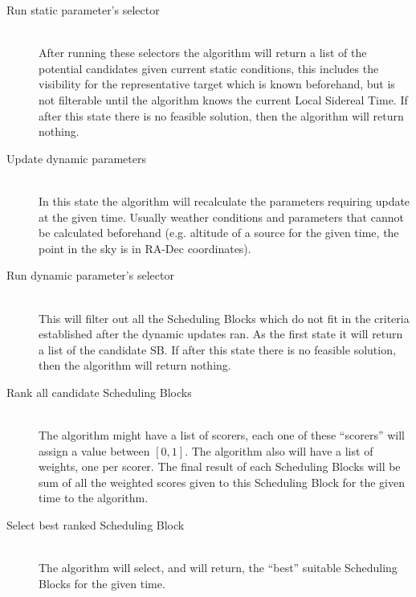 \begin{description}
\item[Run static parameter's selector] \hfill \\
After running these selectors the algorithm will return a list of the potential candidates given current static conditions, this includes the visibility for the representative target which is known beforehand, but is not filterable until the algorithm knows the current Local Sidereal Time. If after this state there is no feasible solution, then the algorithm will return nothing.

\item[Update dynamic parameters] \hfill \\
In this state the algorithm will recalculate the parameters requiring update at the given time. Usually weather conditions and parameters that cannot be calculated beforehand (e.g. altitude of a source for the given time, the point in the sky is in RA-Dec coordinates).  

\item[Run dynamic parameter's selector] \hfill \\
This will filter out all the Scheduling Blocks which do not fit in the criteria established after the dynamic updates ran. As the first state it will return a list of the candidate SB. If after this state there is no feasible solution, then the algorithm will return nothing.

\item[Rank all candidate Scheduling Blocks] \hfill \\
The algorithm might have a list of scorers, each one of these ``scorers'' will assign a value between ${[ 0 , 1 ]}$. The algorithm also will have a list of weights, one per scorer. The final result of each Scheduling Blocks will be sum of all the weighted scores given to this Scheduling Block for the given time to the algorithm.

\item[Select best ranked Scheduling Block] \hfill \\
The algorithm will select, and will return, the ``best'' suitable Scheduling Blocks for the given time.

\end{description}

